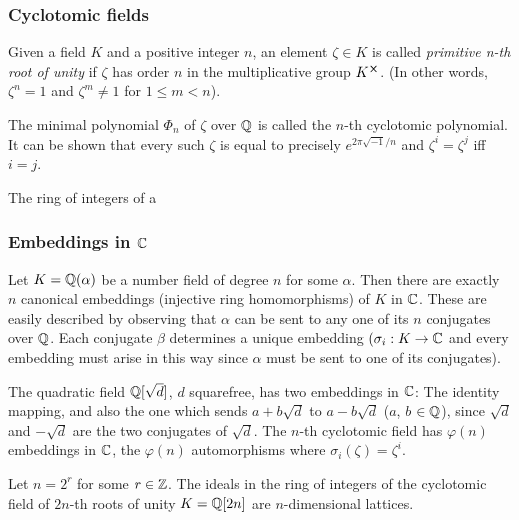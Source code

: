\subsubsection*{Cyclotomic fields}

\begin{definition}
    Given a field $K$ and a positive integer $n$, an element $\zeta \in K$ is called \textit{primitive n-th root of unity} if $\zeta$ has order $n$ in the multiplicative group $K^{\cross}$. (In other words, $\zeta^n = 1$ and $\zeta^m \neq 1$ for $1 \leq m < n$).
\end{definition}
The minimal polynomial $\Phi_n$ of $\zeta$ over $\mathbb{Q}$ is called the $n$-th cyclotomic polynomial. It can be shown that every such $\zeta$ is equal to precisely $e^{2\pi \sqrt{-1}/n}$ and $\zeta^i = \zeta^j$ iff $i = j$.

\begin{proposition}
    The ring of integers of a
\end{proposition}

\subsubsection*{Embeddings in $\mathbb{C}$}
Let $K = \mathbb{Q}(\alpha)$ be a number field of degree $n$ for some $\alpha$. Then there are exactly $n$ canonical embeddings (injective ring homomorphisms) of $K$ in $\mathbb{C}$. These are easily described by observing that $\alpha$ can be sent to any one of its $n$ conjugates over $\mathbb{Q}$. Each conjugate $\beta$ determines a unique embedding $(\sigma_i: K \rightarrow \mathbb{C}$ and every embedding must arise in this way since $\alpha$ must be sent to one of its conjugates).

\begin{example}
    The quadratic field $\mathbb{Q}[\sqrt{d}]$, $d$ squarefree, has two embeddings in $\mathbb{C}$: The identity mapping, and also the one which sends $a + b\sqrt{d}$ to $a - b\sqrt{d}$ ($a$, $b$ $\in \mathbb{Q}$), since $\sqrt{d}$ and $-\sqrt{d}$ are the two conjugates of $\sqrt{d}$. The $n$-th cyclotomic field has $\varphi(n)$ embeddings in $\mathbb{C}$, the $\varphi(n)$ automorphisms where $\sigma_i(\zeta) = \zeta^i$.
\end{example}

\iffalse
\begin{corollary}
    Let $n = 2^r$ for some $r \in \mathbb{Z}$. The ideals in the ring of integers of the cyclotomic field of $2n$-th roots of unity $K = \mathbb{Q}[2n]$ are $n$-dimensional lattices.
\end{corollary}

